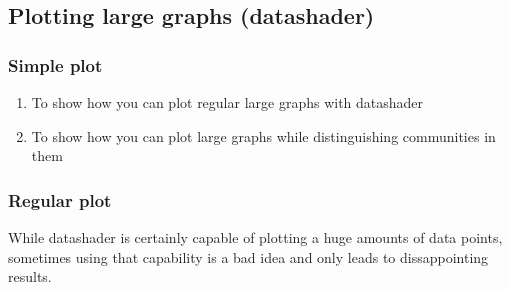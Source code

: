 \documentclass[12pt, a4paper]{article}
\begin{document}
\subsection{Plotting large graphs (datashader)}
\subsubsection{Simple plot}

\begin{enumerate}
  \item To show how you can plot regular large graphs with datashader
  \item To show how you can plot large graphs while distinguishing communities in them
\end{enumerate}



\subsubsection{Regular plot}




While datashader is certainly capable of plotting a huge amounts of data points, sometimes using that capability is a bad idea and only leads to dissappointing results.
\end{document}
